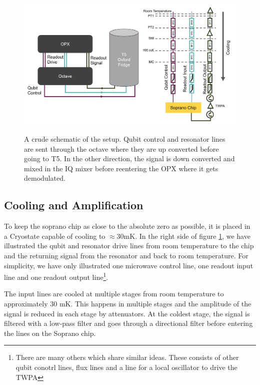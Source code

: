 \begin{figure}[t]
    \caption{A crude schematic of the setup. Qubit control and resonator lines are sent through the octave where they are up converted before going to T5. In the other direction, the signal is down converted and mixed in the IQ mixer before reentering the OPX where it gets demodulated.}
    \includegraphics[]{Figs/hardware/fridge_and_control.png}
    \label{fig:Fridge_control_hardware_setup}
\end{figure}


\subsection{Cooling and Amplification}
To keep the soprano chip as close to the absolute zero as possible, it is placed in a Cryostate capable of cooling to $\approx 30 \text{mK}$. In the right side of  figure \ref{fig:Fridge_control_hardware_setup}, we have illustrated the qubit and resonator drive lines from room temperature to the chip and the returning signal from the resonator and back to room temperature. For simplicity, we have only illustrated one microwave control line, one readout input line and one readout output line\footnote{There are many others which share similar ideas. These consists of other qubit conotrl lines, flux lines and a line for a local oscillator to drive the TWPA}.

The input lines are cooled at multiple stages from room temperature to approximately $30 \text{ mK}$. This happens in multiple stages and the amplitude of the signal is reduced in each stage by attenuators. At the coldest stage, the signal is filtered with a low-pass filter and goes through a directional filter before entering the lines on the Soprano chip. 

